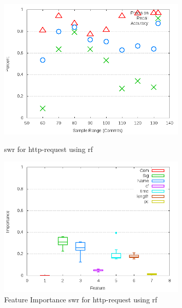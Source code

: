 
\begin{figure}[!ht]
    \centering

        \includegraphics[width=0.8\textwidth]{images/rf/test_1/http-request_sample_range}
        \caption{\gls{swr} for http-request using \gls{rf}}
        \label{fig:test_1_http-request_rf}

    \includegraphics[width=0.8\textwidth]{images/rf/test_1/http-request_importance}
        \caption{Feature Importance \gls{swr} for http-request using \gls{rf}}
        \label{fig:test_1_http-request_rf_importance}
\end{figure}

